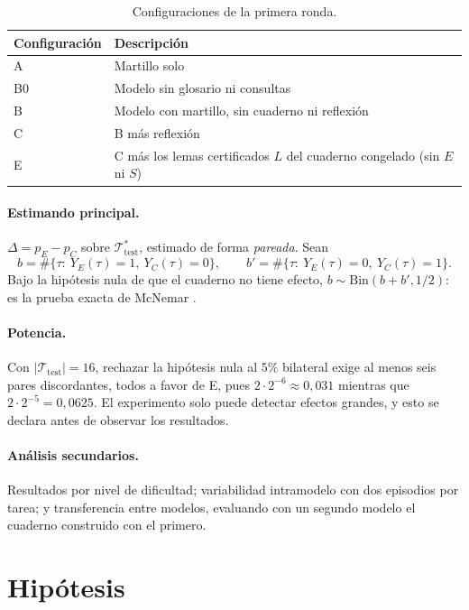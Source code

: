 \documentclass[11pt]{article}
\theoremstyle{remark}
\newcommand{\T}{\mathcal{T}}
\newcommand{\1}{\mathbb{1}}
\begin{document}
\begin{table}[h]
\centering
\begin{tabular}{@{}ll@{}}
\toprule
Configuración & Descripción\\
\midrule
A & Martillo solo\\
B0 & Modelo sin glosario ni consultas\\
B & Modelo con martillo, sin cuaderno ni reflexión\\
C & B más reflexión\\
E & C más los lemas certificados $L$ del cuaderno congelado (sin $E$ ni $S$)\\
\bottomrule
\end{tabular}
\caption{Configuraciones de la primera ronda.}\label{tab:conf}
\end{table}

\paragraph{Estimando principal.} $\Delta=p_E-p_C$ sobre $\T^*_{\mathrm{test}}$, estimado de forma \emph{pareada}. Sean
\[
b=\#\{\tau:\ Y_E(\tau)=1,\ Y_C(\tau)=0\},\qquad
b'=\#\{\tau:\ Y_E(\tau)=0,\ Y_C(\tau)=1\}.
\]
Bajo la hipótesis nula de que el cuaderno no tiene efecto, $b\sim\mathrm{Bin}(b+b',1/2)$: es la prueba exacta de McNemar \cite{mcnemar1947}.

\paragraph{Potencia.} Con $|\T_{\mathrm{test}}|=16$, rechazar la hipótesis nula al $5\%$ bilateral exige al menos seis pares discordantes, todos a favor de E, pues $2\cdot 2^{-6}\approx 0{,}031$ mientras que $2\cdot 2^{-5}=0{,}0625$. El experimento solo puede detectar efectos grandes, y esto se declara antes de observar los resultados.

\paragraph{Análisis secundarios.} Resultados por nivel de dificultad; variabilidad intramodelo con dos episodios por tarea; y transferencia entre modelos, evaluando con un segundo modelo el cuaderno construido con el primero.

\section{Hipótesis}
\end{document}
